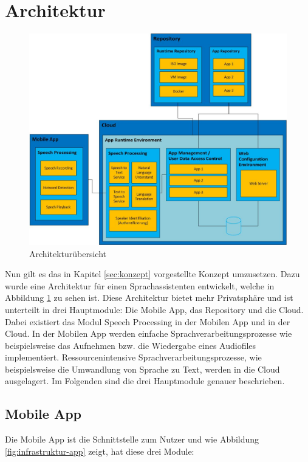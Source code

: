 \section{Architektur}\label{sec:architecure}

\begin{figure}[!h]
	\centering
	\includegraphics[width=0.7\linewidth]{Picture/Infrastruktur.jpg}
	\caption[Architekturübersicht]{Architekturübersicht}
	\label{fig:infrastruktur}
\end{figure}

Nun gilt es das in Kapitel \ref{sec:konzept} vorgestellte Konzept umzusetzen. Dazu wurde eine Architektur für einen Sprachassistenten entwickelt, welche in Abbildung \ref{fig:infrastruktur} zu sehen ist. 
Diese Architektur bietet mehr Privatsphäre und ist unterteilt in drei Hauptmodule: Die Mobile App, das Repository und die Cloud. Dabei existiert das Modul \glqq Speech Processing\grqq{} in der Mobilen App und in der Cloud. In der Mobilen App werden einfache Sprachverarbeitungsprozesse wie beispielsweise das Aufnehmen bzw. die Wiedergabe eines Audiofiles implementiert. Ressourcenintensive Sprachverarbeitungsprozesse, wie beispielsweise die Umwandlung von Sprache zu Text, werden in die Cloud ausgelagert. Im Folgenden sind die drei Hauptmodule genauer beschrieben.

\subsection{Mobile App}
Die Mobile App ist die Schnittstelle zum Nutzer und wie Abbildung \ref{fig:infrastruktur-app} zeigt, hat diese drei Module:

